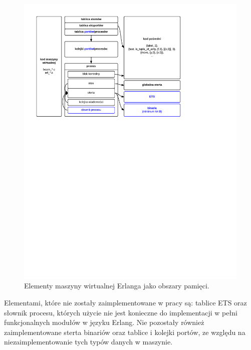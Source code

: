 \begin{figure}[h]
\centerline{\includegraphics[scale=1, clip, trim=0 160mm 55mm 0]{erts_memory}}
\caption{Elementy maszyny wirtualnej Erlanga jako obszary pamięci.}
\label{fig:ertsmemory}
\end{figure}

Elementami, które nie zostały zaimplementowane w pracy są: tablice ETS oraz słownik procesu, których użycie nie jest konieczne do implementacji w pełni funkcjonalnych modułów w języku Erlang. Nie pozostały również zaimplementowane sterta binariów oraz tablice i kolejki portów, ze względu na niezaimplementowanie tych typów danych w maszynie.